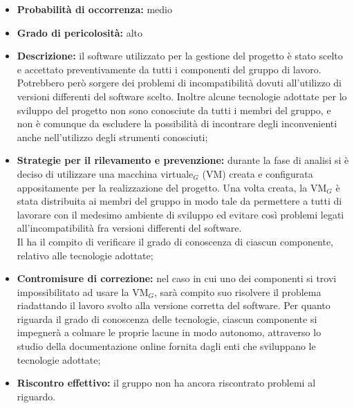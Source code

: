 \begin{itemize}
\item \textbf{Probabilità di occorrenza:} medio
\item \textbf{Grado di pericolosità:} alto
\item \textbf{Descrizione:} il software utilizzato per la gestione del progetto è stato scelto e accettato preventivamente da tutti i componenti del gruppo di lavoro. Potrebbero però sorgere dei problemi di incompatibilità dovuti all'utilizzo di versioni differenti del software scelto. Inoltre alcune tecnologie adottate per lo sviluppo del progetto non sono conosciute da tutti i membri del gruppo, e non è comunque da escludere la possibilità di incontrare degli inconvenienti anche nell'utilizzo degli strumenti conosciuti;

\item \textbf{Strategie per il rilevamento e prevenzione:} durante la fase di analisi si è deciso di utilizzare una macchina virtuale$_G$ (VM) creata e configurata appositamente per la realizzazione del progetto. Una volta creata, la VM$_G$ è stata distribuita ai membri del gruppo in modo tale da permettere a tutti di lavorare con il medesimo ambiente di sviluppo ed evitare così problemi legati all'incompatibilità fra versioni differenti del software. \\
Il \ruoloResponsabile{} ha il compito di verificare il grado di conoscenza di ciascun componente, relativo alle tecnologie adottate;
 
\item \textbf{Contromisure di correzione:} nel caso in cui uno dei componenti si trovi impossibilitato ad usare la VM$_G$, sarà compito suo risolvere il problema riadattando il lavoro svolto alla versione corretta del software.
Per quanto riguarda il grado di conoscenza delle tecnologie, ciascun componente si impegnerà a colmare le proprie lacune in modo autonomo, attraverso lo studio della documentazione online fornita dagli enti che sviluppano le tecnologie adottate;

\item \textbf{Riscontro effettivo:} il gruppo non ha ancora riscontrato problemi al riguardo.
\end{itemize}



